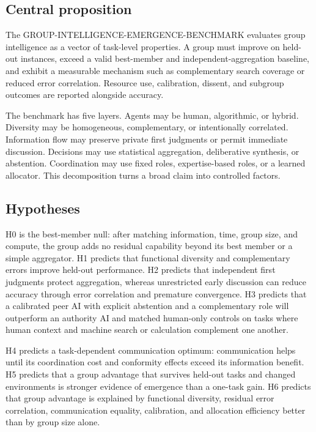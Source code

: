 \documentclass[conference]{IEEEtran}
\begin{document}
\subsection{Central proposition}

The GROUP-INTELLIGENCE-EMERGENCE-BENCHMARK evaluates group intelligence as a vector of task-level properties. A group must improve on held-out instances, exceed a valid best-member and independent-aggregation baseline, and exhibit a measurable mechanism such as complementary search coverage or reduced error correlation. Resource use, calibration, dissent, and subgroup outcomes are reported alongside accuracy.

The benchmark has five layers. Agents may be human, algorithmic, or hybrid. Diversity may be homogeneous, complementary, or intentionally correlated. Information flow may preserve private first judgments or permit immediate discussion. Decisions may use statistical aggregation, deliberative synthesis, or abstention. Coordination may use fixed roles, expertise-based roles, or a learned allocator. This decomposition turns a broad claim into controlled factors.

\subsection{Hypotheses}

H0 is the best-member null: after matching information, time, group size, and compute, the group adds no residual capability beyond its best member or a simple aggregator. H1 predicts that functional diversity and complementary errors improve held-out performance. H2 predicts that independent first judgments protect aggregation, whereas unrestricted early discussion can reduce accuracy through error correlation and premature convergence. H3 predicts that a calibrated peer AI with explicit abstention and a complementary role will outperform an authority AI and matched human-only controls on tasks where human context and machine search or calculation complement one another.

H4 predicts a task-dependent communication optimum: communication helps until its coordination cost and conformity effects exceed its information benefit. H5 predicts that a group advantage that survives held-out tasks and changed environments is stronger evidence of emergence than a one-task gain. H6 predicts that group advantage is explained by functional diversity, residual error correlation, communication equality, calibration, and allocation efficiency better than by group size alone.
\end{document}
